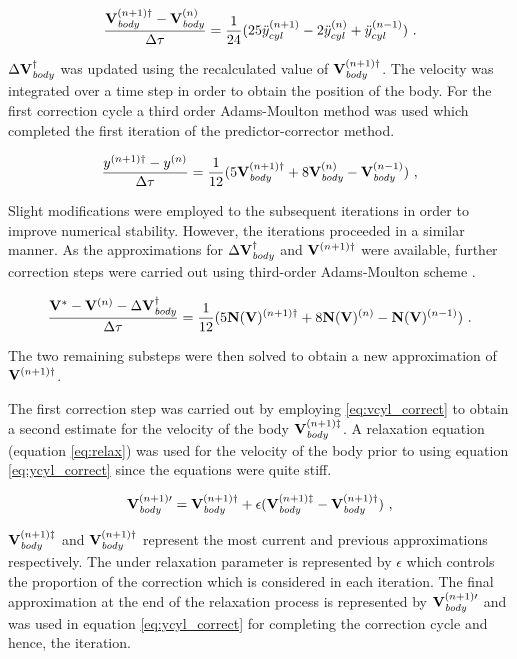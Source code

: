 \begin{equation} \centering
 \label{eq:vcyl_correct}
 \frac{\Vcyl^{(n+1)\dag} - \Vcyl^{(n)}}{\Delta\tau} = \frac{1}{24}(25\ddot{y}_{cyl}^{(n+1)} - 2\ddot{y}_{cyl}^{(n)} + \ddot{y}_{cyl}^{(n-1)}) ~.
 \end{equation}
 
 $\Delta\mathbf{V}_{\mathit{body}}^{\dag}$ was updated using the recalculated value of $\mathbf{V}_{\mathit{body}}^{(n+1)\dag}$. The velocity was integrated over a time step in order to obtain the position of the body. For the first correction cycle a third order Adams-Moulton method was used which completed the first iteration of the predictor-corrector method. 
 
 \begin{equation} \centering
 \label{eq:ycyl_correct}
 \frac{y^{(n+1)\dag} - y^{(n)}}{\Delta\tau} = \frac{1}{12}(5\Vcyl^{(n+1)\dag} + 8\Vcyl^{(n)} - \Vcyl^{(n-1)}) ~,
 \end{equation}
 
 Slight modifications were employed to the subsequent iterations in order to improve numerical stability. However, the iterations proceeded in a similar manner. As the approximations for  $\Delta\mathbf{V}_{\mathit{body}}^{\dag}$ and $\mathbf{V}^{(n+1)\dag}$  were available, further correction steps were carried out using third-order Adams-Moulton scheme . 
 
 \begin{equation} \centering
 \label{eq:predict_general}
 \frac{\Vint - \Vn - \Delta\Vcyl^{\dag}}{\Delta\tau} = \frac{1}{12}(5\mathbf{N}(\vecV)^{(n+1)\dag} + 8\mathbf{N}(\vecV)^{(n)} - \mathbf{N}(\vecV)^{(n-1)}) ~.
 \end{equation}
 
 The two remaining substeps were then solved to obtain a new approximation of $\mathbf{V}^{(n+1)\dag}$. 
 
 The first correction step was carried out by employing \ref{eq:vcyl_correct} to obtain a second estimate for the velocity of the body $\mathbf{V}_{\mathit{body}}^{(n+1)\ddag}$. A relaxation equation (equation \ref{eq:relax}) was used for the velocity of the body prior to using equation \ref{eq:ycyl_correct} since the equations were quite stiff.
 
 \begin{equation} \centering
 \label{eq:relax}
 \Vcyl^{(n+1)\prime} = \Vcyl^{(n+1)\dag} + \epsilon(\Vcyl^{(n+1)\ddag} - \Vcyl^{(n+1)\dag}) ~,
 \end{equation}
 
 $\mathbf{V}_{\mathit{body}}^{(n+1)\ddag}$ and $\mathbf{V}_{\mathit{body}}^{(n+1)\dag}$ represent the most current and previous approximations respectively. The under relaxation parameter is represented by $\epsilon$ which controls the proportion of the correction which is considered in each iteration. The final approximation at the end of the relaxation process is represented by $\mathbf{V}_{\mathit{body}}^{(n+1)\prime}$ and was used in equation \ref{eq:ycyl_correct} for completing the correction cycle and hence, the iteration.
 
